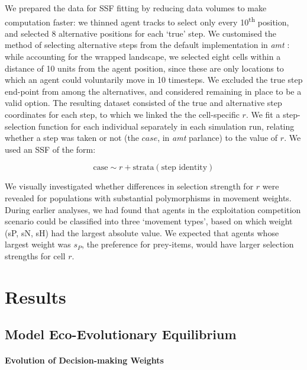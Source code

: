     We prepared the data for SSF fitting by reducing data volumes to make computation faster: we thinned agent tracks to select only every 10\textsuperscript{th} position, and selected 8 alternative positions for each `true' step.
    We customised the method of selecting alternative steps from the default implementation in \textit{amt} \citep{signer2019}: while accounting for the wrapped landscape, we selected eight cells within a distance of 10 units from the agent position, since these are only locations to which an agent could voluntarily move in 10 timesteps.
    We excluded the true step end-point from among the alternatives, and considered remaining in place to be a valid option.
    The resulting dataset consisted of the true and alternative step coordinates for each step, to which we linked the the cell-specific $r$.
    We fit a step-selection function for each individual separately in each simulation run, relating whether a step was taken or not (the $case$, in \textit{amt} parlance) to the value of $r$.
    We used an SSF of the form:
    \begin{linenomath*}
        \begin{equation}
            \text{case} \sim r + \text{strata}(\text{step~identity})
        \end{equation}
    \end{linenomath*}
    We visually investigated whether differences in selection strength for $r$ were revealed for populations with substantial polymorphisms in movement weights.
    During earlier analyses, we had found that agents in the exploitation competition scenario could be classified into three `movement types', based on which weight (sP, sN, sH) had the largest absolute value.
    We expected that agents whose largest weight was $s_P$, the preference for prey-items, would have larger selection strengths for cell $r$.
    
    \section*{Results}
    
    \subsection*{Model Eco-Evolutionary Equilibrium}
    
    \paragraph{Evolution of Decision-making Weights}
    
